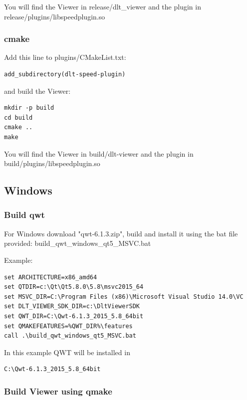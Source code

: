 \documentclass[a4paper,11pt]{article}
\begin{document}
You will find the Viewer in release/dlt\_viewer and the plugin in release/plugins/libspeedplugin.so

\subsubsection{cmake}

Add this line to plugins/CMakeList.txt:

\begin{verbatim}
add_subdirectory(dlt-speed-plugin)
\end{verbatim}

and build the Viewer:

\begin{verbatim}
mkdir -p build
cd build
cmake ..
make
\end{verbatim}

You will find the Viewer in build/dlt-viewer and the plugin in build/plugins/libspeedplugin.so

\subsection{Windows}

\subsubsection{Build qwt}

For Windows download "qwt-6.1.3.zip", build and install it using the bat file provided:
build\_qwt\_windows\_qt5\_MSVC.bat

Example:
\begin{verbatim}
set ARCHITECTURE=x86_amd64
set QTDIR=c:\Qt\Qt5.8.0\5.8\msvc2015_64
set MSVC_DIR=C:\Program Files (x86)\Microsoft Visual Studio 14.0\VC
set DLT_VIEWER_SDK_DIR=c:\DltViewerSDK
set QWT_DIR=C:\Qwt-6.1.3_2015_5.8_64bit
set QMAKEFEATURES=%QWT_DIR%\features
call .\build_qwt_windows_qt5_MSVC.bat
\end{verbatim}

In this example QWT will be installed in
\begin{verbatim}
C:\Qwt-6.1.3_2015_5.8_64bit
\end{verbatim}

\subsubsection{Build Viewer using qmake}
\end{document}
